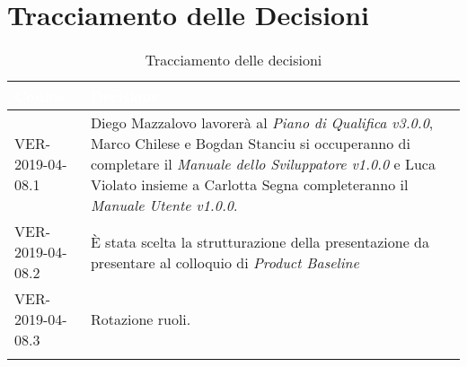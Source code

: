 \newpage
\section{Tracciamento delle Decisioni}

\begin{longtable}{|C{.40\textwidth}|C{.60\textwidth}|}
\hline
{}\textbf{\textcolor{white}{Codice}} & \textbf{\textcolor{white}{Decisione}}\\
\hline
VER-2019-04-08.1 & Diego Mazzalovo lavorerà al \textit{Piano di Qualifica v3.0.0}, Marco Chilese e Bogdan Stanciu si occuperanno di completare il \textit{Manuale dello Sviluppatore v1.0.0} e Luca Violato insieme a Carlotta Segna completeranno il \textit{Manuale Utente v1.0.0}. \\
\hline
{}VER-2019-04-08.2 & È stata scelta la strutturazione della presentazione da presentare al colloquio di \textit{Product Baseline} \\
\hline
VER-2019-04-08.3 & Rotazione ruoli. \\
\hline

\caption{Tracciamento delle decisioni}
\end{longtable}
